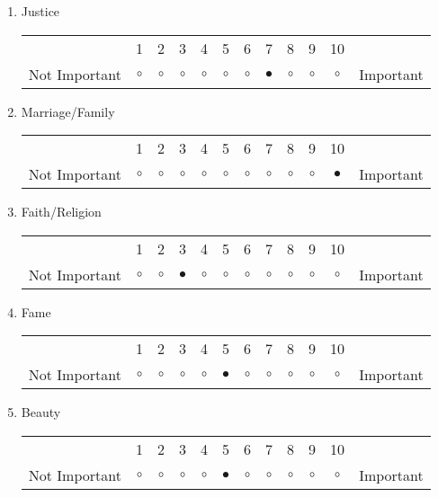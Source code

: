 \documentclass{article}
\begin{document}
\begin{enumerate}
\item Justice\\
\vspace{5pt}
\begin{tabular}{c c c c c c c c c c c c}
     & 1 & 2 & 3 & 4 & 5 & 6 & 7 & 8 & 9 & 10 & \\
    Not Important & $\circ$ & $\circ$ & $\circ$ & $\circ$ & $\circ$ & $\circ$ & $\bullet$ & $\circ$ & $\circ$ & $\circ$ & Important \\ 
\end{tabular}

\item Marriage/Family \\
\vspace{5pt}
\begin{tabular}{c c c c c c c c c c c c}
     & 1 & 2 & 3 & 4 & 5 & 6 & 7 & 8 & 9 & 10 & \\
    Not Important & $\circ$ & $\circ$ & $\circ$ & $\circ$ & $\circ$ & $\circ$ & $\circ$ & $\circ$ & $\circ$ & $\bullet$ & Important \\ 
\end{tabular}

\item Faith/Religion\\
\vspace{5pt}
\begin{tabular}{c c c c c c c c c c c c}
     & 1 & 2 & 3 & 4 & 5 & 6 & 7 & 8 & 9 & 10 & \\
    Not Important & $\circ$ & $\circ$ & $\bullet$ & $\circ$ & $\circ$ & $\circ$ & $\circ$ & $\circ$ & $\circ$ & $\circ$ & Important \\ 
\end{tabular}

\item Fame\\
\vspace{5pt}
\begin{tabular}{c c c c c c c c c c c c}
     & 1 & 2 & 3 & 4 & 5 & 6 & 7 & 8 & 9 & 10 & \\
    Not Important & $\circ$ & $\circ$ & $\circ$ & $\circ$ & $\bullet$ & $\circ$ & $\circ$ & $\circ$ & $\circ$ & $\circ$ & Important \\ 
\end{tabular}

\item Beauty\\
\vspace{5pt}
\begin{tabular}{c c c c c c c c c c c c}
     & 1 & 2 & 3 & 4 & 5 & 6 & 7 & 8 & 9 & 10 & \\
    Not Important & $\circ$ & $\circ$ & $\circ$ & $\circ$ & $\bullet$ & $\circ$ & $\circ$ & $\circ$ & $\circ$ & $\circ$ & Important \\ 
\end{tabular}


\end{enumerate}
\end{document}
